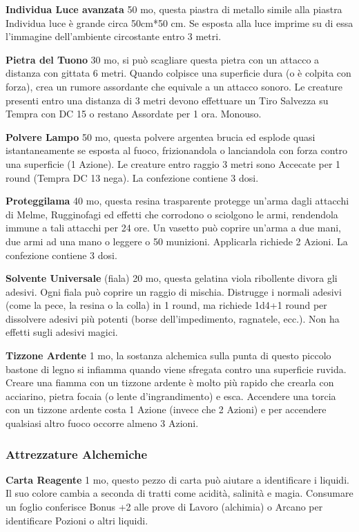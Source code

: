 \documentclass[12pt,a4paper,twoside,openany]{book}
\begin{document}
\begin{multicols}{2}
\textbf{Individua Luce avanzata} 50 mo, questa piastra di metallo simile alla piastra Individua luce è grande circa 50cm*50 cm. Se esposta alla luce imprime su di essa l'immagine dell'ambiente circostante entro 3 metri.

\textbf{Pietra del Tuono} 30 mo, si può scagliare questa pietra con un attacco a distanza con gittata 6 metri. Quando colpisce una superficie dura (o è colpita con forza), crea un rumore assordante che equivale a un attacco sonoro. Le creature presenti entro una distanza di 3 metri devono effettuare un Tiro Salvezza su Tempra con DC 15 o restano Assordate per 1 ora. Monouso.

\textbf{Polvere Lampo} 50 mo, questa polvere argentea brucia ed esplode quasi istantaneamente se esposta al fuoco, frizionandola o lanciandola con forza contro una superficie (1 Azione). Le creature entro raggio 3 metri sono Accecate per 1 round (Tempra DC 13 nega). La confezione contiene 3 dosi. 

\textbf{Proteggilama} 40 mo, questa resina trasparente protegge un'arma dagli attacchi di Melme, Rugginofagi ed effetti che corrodono o sciolgono le armi, rendendola immune a tali attacchi per 24 ore. Un vasetto può coprire un'arma a due mani, due armi ad una mano o leggere o 50 munizioni. Applicarla richiede 2 Azioni. La confezione contiene 3 dosi.

\textbf{Solvente Universale} (fiala) 20 mo, questa gelatina viola ribollente divora gli adesivi. Ogni fiala può coprire un raggio di mischia. Distrugge i normali adesivi (come la pece, la resina o la colla) in 1 round, ma richiede 1d4+1 round per dissolvere adesivi più potenti (borse dell'impedimento, ragnatele, ecc.). Non ha effetti sugli adesivi magici.

\textbf{Tizzone Ardente} 1 mo, la sostanza alchemica sulla punta di questo piccolo bastone di legno si infiamma quando viene sfregata contro una superficie ruvida. Creare una fiamma con un tizzone ardente è molto più rapido che crearla con acciarino, pietra focaia (o lente d'ingrandimento) e esca. Accendere una torcia con un tizzone ardente costa 1 Azione (invece che 2 Azioni) e per accendere qualsiasi altro fuoco occorre almeno 3 Azioni.

\subsubsection{Attrezzature Alchemiche}

\textbf{Carta Reagente} 1 mo, questo pezzo di carta può aiutare a identificare i liquidi. Il suo colore cambia a seconda di tratti come acidità, salinità e magia. Consumare un foglio conferisce Bonus +2 alle prove di Lavoro (alchimia) o Arcano per identificare Pozioni o altri liquidi.


\end{multicols}
\end{document}
